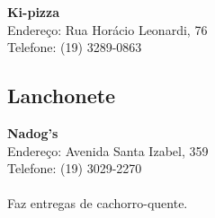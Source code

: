 \begin{itemsize}
\item \textbf{Ki-pizza}
  \\Endereço: Rua Horácio Leonardi, 76
  \\Telefone: (19) 3289-0863
  \\
\end{itemsize}

\subsection{Lanchonete}

\begin{itemsize}
\item \textbf{Nadog's}
  \\Endereço: Avenida Santa Izabel, 359
  \\Telefone: (19) 3029-2270
  \\
  \\Faz entregas de cachorro-quente.
\end{itemsize}
